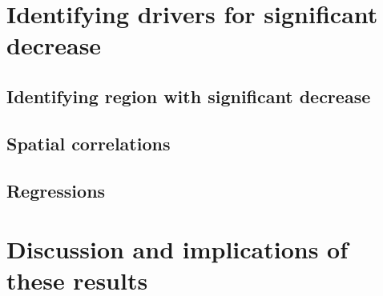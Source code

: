 \documentclass[../main.tex]{subfiles}
\begin{document}
\section{Identifying drivers for significant decrease}

\subsection{Identifying region with significant decrease}

\subsection{Spatial correlations}

\subsection{Regressions}

\section{Discussion and implications of these results}
\end{document}
